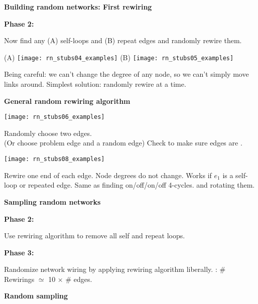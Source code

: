 \begin{frame}[label=]
\begin{frame}[label=]
\begin{frame}[label=]
  \textbf{Building random networks: First rewiring}

  \textbf{Phase 2:}
    
     Now find any (A) self-loops and (B) repeat edges 
      and \alert{randomly rewire} them.
      \begin{center}
        (A)
        \texttt{[image: rn\_stubs04\_examples]}
        \qquad
        (B)
        \texttt{[image: rn\_stubs05\_examples]}
      \end{center}
     \alert{Being careful:} we can't change
      the degree of any node, so we can't simply move
      links around.
     \alert{Simplest solution:} 
      randomly rewire  at a time.
    
  


\begin{frame}[label=]
  \textbf{General random rewiring algorithm}

      
    \texttt{[image: rn\_stubs06\_examples]}
    
    
     Randomly choose \alert{two edges}.\\
      (Or choose problem edge and a random edge)
     Check to make sure edges are .
    
        
          
      
      \texttt{[image: rn\_stubs08\_examples]}
        
    
     Rewire one end of each edge.
     Node degrees \alert{do not change}.
     Works if $e_1$ is a self-loop or repeated edge.
     Same as finding on/off/on/off 4-cycles.
      and rotating them.
    
    

\begin{frame}[label=]
  \textbf{Sampling random networks}

  \textbf{Phase 2:}
    
     Use rewiring algorithm to remove
      all self and repeat loops.
    
    

  \textbf{Phase 3:}
    
     \alert{Randomize network} wiring by applying
      rewiring algorithm liberally.
     :
      \# Rewirings $\simeq$
      10 $\times$ \# edges\cite{milo2003a}.
    
    
  

\begin{frame}[label=]
  \textbf{Random sampling}


\end{frame}
\end{frame}
\end{frame}
\end{frame}
\end{frame}
\end{frame}

